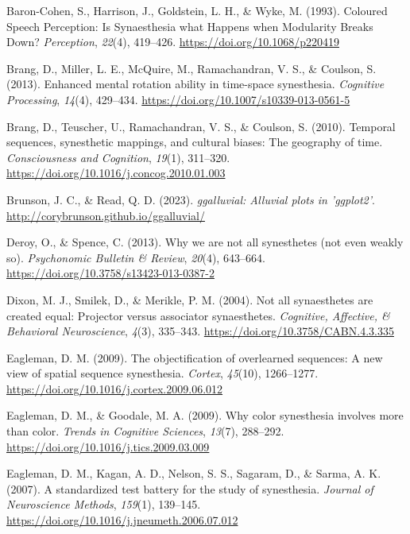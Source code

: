 \documentclass[
  man,
  longtable,
  a4paper,
  nolmodern,
  notxfonts,
  notimes,
  colorlinks=true,linkcolor=blue,citecolor=blue,urlcolor=blue]{apa7}
\newlength{\cslhangindent}
\newenvironment{CSLReferences}[2] %
 {\begin{list}{}{%
  \setlength{\itemindent}{0pt}
  \setlength{\leftmargin}{0pt}
  \setlength{\parsep}{0pt}
  \ifodd #1
   \setlength{\leftmargin}{\cslhangindent}
   \setlength{\itemindent}{-1\cslhangindent}
  \fi
  \setlength{\itemsep}{#2\baselineskip}}}
 {\end{list}}
\begin{document}
\label{refs}
\begin{CSLReferences}{1}{0}
Baron-Cohen, S., Harrison, J., Goldstein, L. H., \& Wyke, M. (1993).
Coloured Speech Perception: Is Synaesthesia what Happens when Modularity
Breaks Down? \emph{Perception}, \emph{22}(4), 419--426.
\url{https://doi.org/10.1068/p220419}

Brang, D., Miller, L. E., McQuire, M., Ramachandran, V. S., \& Coulson,
S. (2013). Enhanced mental rotation ability in time-space synesthesia.
\emph{Cognitive Processing}, \emph{14}(4), 429--434.
\url{https://doi.org/10.1007/s10339-013-0561-5}

Brang, D., Teuscher, U., Ramachandran, V. S., \& Coulson, S. (2010).
Temporal sequences, synesthetic mappings, and cultural biases: The
geography of time. \emph{Consciousness and Cognition}, \emph{19}(1),
311--320. \url{https://doi.org/10.1016/j.concog.2010.01.003}

Brunson, J. C., \& Read, Q. D. (2023). \emph{{ggalluvial}: Alluvial
plots in 'ggplot2'}. \url{http://corybrunson.github.io/ggalluvial/}

Deroy, O., \& Spence, C. (2013). Why we are not all synesthetes (not
even weakly so). \emph{Psychonomic Bulletin \& Review}, \emph{20}(4),
643--664. \url{https://doi.org/10.3758/s13423-013-0387-2}

Dixon, M. J., Smilek, D., \& Merikle, P. M. (2004). Not all synaesthetes
are created equal: Projector versus associator synaesthetes.
\emph{Cognitive, Affective, \& Behavioral Neuroscience}, \emph{4}(3),
335--343. \url{https://doi.org/10.3758/CABN.4.3.335}

Eagleman, D. M. (2009). The objectification of overlearned sequences: A
new view of spatial sequence synesthesia. \emph{Cortex}, \emph{45}(10),
1266--1277. \url{https://doi.org/10.1016/j.cortex.2009.06.012}

Eagleman, D. M., \& Goodale, M. A. (2009). Why color synesthesia
involves more than color. \emph{Trends in Cognitive Sciences},
\emph{13}(7), 288--292. \url{https://doi.org/10.1016/j.tics.2009.03.009}

Eagleman, D. M., Kagan, A. D., Nelson, S. S., Sagaram, D., \& Sarma, A.
K. (2007). A standardized test battery for the study of synesthesia.
\emph{Journal of Neuroscience Methods}, \emph{159}(1), 139--145.
\url{https://doi.org/10.1016/j.jneumeth.2006.07.012}


\end{CSLReferences}
\end{document}
